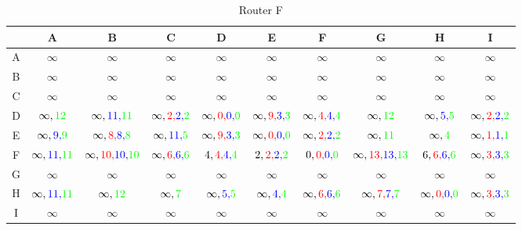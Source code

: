 \documentclass[a4paper,10pt]{article}
\begin{document}
\begin{table}[H]
\centering
\begin{tabular}{|c|c|c|c|c|c|c|c|c|c|} \hline
 & A & B & C & D & E & F & G & H & I  \\\hline
A & $\infty $ & $\infty $ & $\infty $ & $\infty$ & $\infty$ & $\infty $ & $ \infty$ & $\infty $ & $ \infty$ \\\hline
B & $\infty $ & $\infty $ & $\infty$ & $ \infty$ & $ \infty$ & $\infty $ & $ \infty$ & $\infty $ & $ \infty$ \\\hline
C & $\infty $ & $\infty $ & $\infty$ & $ \infty$ & $ \infty$ & $\infty $ & $ \infty$ & $\infty $ & $ \infty$ \\\hline
D & $\infty,{\color{green}12} $ & $\infty,{\color{blue}11,}{\color{green}11} $ & $\infty,{\color{red}2,}{\color{blue}2,}{\color{green}2}$ & $ \infty,{\color{red}0,}{\color{blue}0,}{\color{green}0}$ & $ \infty,{\color{red}9,}{\color{blue}3,}{\color{green}3}$ & $\infty,{\color{red}4,}{\color{blue}4,}{\color{green}4} $ & $ \infty,{\color{green}12}$ & $\infty,{\color{blue}5,}{\color{green}5} $ & $ \infty,{\color{red}2,}{\color{blue}2,}{\color{green}2}$ \\\hline
E & $\infty,{\color{blue}9,}{\color{green}9} $ & $\infty,{\color{red}8,}{\color{blue}8,}{\color{green}8}$ & $\infty,{\color{blue}11,}{\color{green}5}$ & $ \infty,{\color{red}9,}{\color{blue}3,}{\color{green}3}$ & $ \infty,{\color{red}0,}{\color{blue}0,}{\color{green}0}$ & $\infty,{\color{red}2,}{\color{blue}2,}{\color{green}2} $ & $ \infty,{\color{green}11}$ & $\infty,{\color{green}4} $ & $ \infty,{\color{red}1,}{\color{blue}1,}{\color{green}1}$ \\\hline
F & $\infty,{\color{blue}11,}{\color{green}11} $ & $\infty,{\color{red}10,}{\color{blue}10,}{\color{green}10} $ & $\infty,{\color{red}6,}{\color{blue}6,}{\color{green}6}$ & $4,{\color{red}4,}{\color{blue}4,}{\color{green}4} $ & $2,{\color{red}2,}{\color{blue}2,}{\color{green}2} $ & $0,{\color{red}0,}{\color{blue}0,}{\color{green}0} $ & $\infty,{\color{red}13,}{\color{blue}13,}{\color{green}13} $ & $6,{\color{red}6,}{\color{blue}6,}{\color{green}6} $ & $\infty,{\color{red}3,}{\color{blue}3,}{\color{green}3} $ \\\hline
G & $\infty $ & $\infty $ & $\infty$ & $\infty $ & $ \infty$ & $\infty $ & $ \infty$ & $\infty$ & $ \infty$ \\\hline
H & $\infty,{\color{blue}11,}{\color{green}11} $ & $\infty,{\color{green}12} $ & $\infty,{\color{green}7}$ & $\infty,{\color{blue}5,}{\color{green}5} $ & $ \infty,{\color{blue}4,}{\color{green}4}$ & $\infty,{\color{red}6,}{\color{blue}6,}{\color{green}6} $ & $ \infty,{\color{red}7,}{\color{blue}7,}{\color{green}7}$ & $\infty,{\color{red}0,}{\color{blue}0,}{\color{green}0}$ & $ \infty,{\color{red}3,}{\color{blue}3,}{\color{green}3}$ \\\hline
I & $ \infty$ & $\infty $ & $ \infty$ & $\infty $ & $ \infty$ & $ \infty$ & $ \infty$ & $ \infty$ & $ \infty$ \\\hline
\end{tabular}
\caption{Router F}
\end{table} \\
\end{document}
